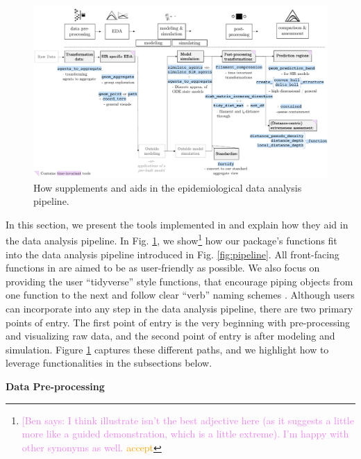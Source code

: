 \documentclass[
  shortnames]{jss}
\begin{document}
\afterpage{\clearpage}
\begin{figure}
    \centering
    \includegraphics[width = 1\textwidth]{images/pipeline2_1.pdf}
    \caption{How  supplements and aids in the epidemiological data analysis pipeline.}
    \label{fig:pipeline2}
\end{figure}

In this section, we present the tools implemented in 
and explain how they aid in the data analysis pipeline. In Fig.
\ref{fig:pipeline2}, we
show\footnote{\textcolor{violet}{[Ben says: I think illustrate isn't the best adjective here (as it suggests a little more like a guided demonstration, which is a little extreme). I'm happy with other synonyms as well.} \textcolor{orange}{accept}}
how our package's functions fit into the data analysis pipeline
introduced in Fig. \ref{fig:pipeline}. All front-facing functions in
 are aimed to be as user-friendly as possible. We also
focus on providing the user ``tidyverse'' style functions, that
encourage piping objects from one function to the next and follow clear
``verb'' naming schemes \citep{Wickham2019}. Although users can
incorporate  into any step in the data analysis
pipeline, there are two primary points of entry. The first point of
entry is the very beginning with pre-processing and visualizing raw
data, and the second point of entry is after modeling and simulation.
Figure \ref{fig:pipeline2} captures these different paths, and we
highlight how to leverage  functionalities in the
subsections below.

\textbf{Data Pre-processing}
\end{document}
